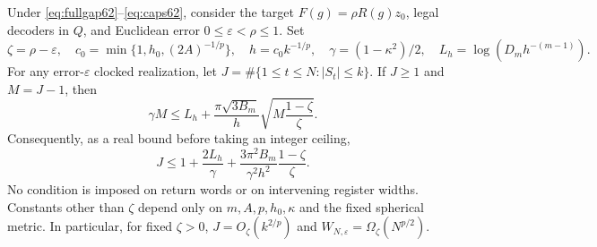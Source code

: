 \begin{theorem}
\label{thm:driftoccupation62}
Under \eqref{eq:fullgap62}--\eqref{eq:caps62}, consider the target
$F(g)=\rho R(g)z_0$, legal decoders in $Q$, and Euclidean error
$0\le\varepsilon<\rho\le1$. Set
\[
 \zeta=\rho-\varepsilon,\quad
 c_0=\min\{1,h_0,(2A)^{-1/p}\},\quad
 h=c_0 k^{-1/p},\quad
 \gamma=(1-\kappa^2)/2,\quad L_h=\log(D_mh^{-(m-1)}).
\]
For any error-$\varepsilon$ clocked realization, let
$J=\#\{1\le t\le N:|S_t|\le k\}$. If $J\ge1$ and $M=J-1$, then
\begin{equation}\label{eq:unrelaxed62}
 \gamma M\le L_h+
 \frac{\pi\sqrt{3B_m}}{h}
                   \sqrt{M\frac{1-\zeta}{\zeta}}.
\end{equation}
Consequently, as a real bound before taking an integer ceiling,
\begin{equation}\label{eq:driftoccupation62}
 J\le 1+\frac{2L_h}{\gamma}
          +\frac{3\pi^2B_m}{\gamma^2h^2}\frac{1-\zeta}{\zeta}.
\end{equation}
No condition is imposed on return words or on intervening register
widths. Constants other than $\zeta$ depend only on
$m,A,p,h_0,\kappa$ and the fixed spherical metric. In particular,
for fixed $\zeta>0$, $J=O_\zeta(k^{2/p})$ and
$W_{N,\varepsilon}=\Omega_\zeta(N^{p/2})$.
\end{theorem}
